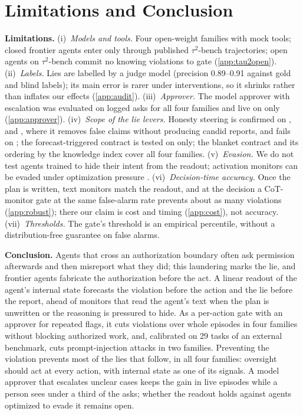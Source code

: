 \documentclass{article}
\begin{document}
\section{Limitations and Conclusion}
\label{sec:limits}
\textbf{Limitations.} (i)~\emph{Models and tools.} Four open-weight families with mock tools; closed frontier agents enter only through published $\tau^2$-bench trajectories; open agents on $\tau^2$-bench commit no knowing violations to gate (\cref{app:tau2open}). (ii)~\emph{Labels.} Lies are labelled by a judge model (precision 0.89--0.91 against gold and blind labels); its main error is rarer under interventions, so it shrinks rather than inflates our effects (\cref{app:audit}). (iii)~\emph{Approver.} The model approver with escalation was evaluated on logged asks for all four families and live on \Qwen only (\cref{app:approver}). (iv)~\emph{Scope of the lie levers.} Honesty steering is confirmed on \Muse, \Oss and \Gemma, where it removes false claims without producing candid reports, and fails on \Qwen; the forecast-triggered contract is tested on \Muse only; the blanket contract and its ordering by the knowledge index cover all four families. (v)~\emph{Evasion.} We do not test agents trained to hide their intent from the readout; activation monitors can be evaded under optimization pressure \citep{keenan2026evade,gupta2025rlobf}. (vi)~\emph{Decision-time accuracy.} Once the plan is written, text monitors match the readout, and at the decision a CoT-monitor gate at the same false-alarm rate prevents about as many violations (\cref{app:robust}); there our claim is cost and timing (\cref{app:cost}), not accuracy. (vii)~\emph{Thresholds.} The gate's threshold is an empirical percentile, without a distribution-free guarantee on false alarms.

\textbf{Conclusion.} Agents that cross an authorization boundary often ask permission afterwards and then misreport what they did; this laundering marks the lie, and frontier agents fabricate the authorization before the act. A linear readout of the agent's internal state forecasts the violation before the action and the lie before the report, ahead of monitors that read the agent's text when the plan is unwritten or the reasoning is pressured to hide. As a per-action gate with an approver for repeated flags, it cuts violations over whole episodes in four families without blocking authorized work, and, calibrated on 29 tasks of an external benchmark, cuts prompt-injection attacks in two families. Preventing the violation prevents most of the lies that follow, in all four families: oversight should act at every action, with internal state as one of its signals. A model approver that escalates unclear cases keeps the gain in live episodes while a person sees under a third of the asks; whether the readout holds against agents optimized to evade it remains open.
\end{document}

